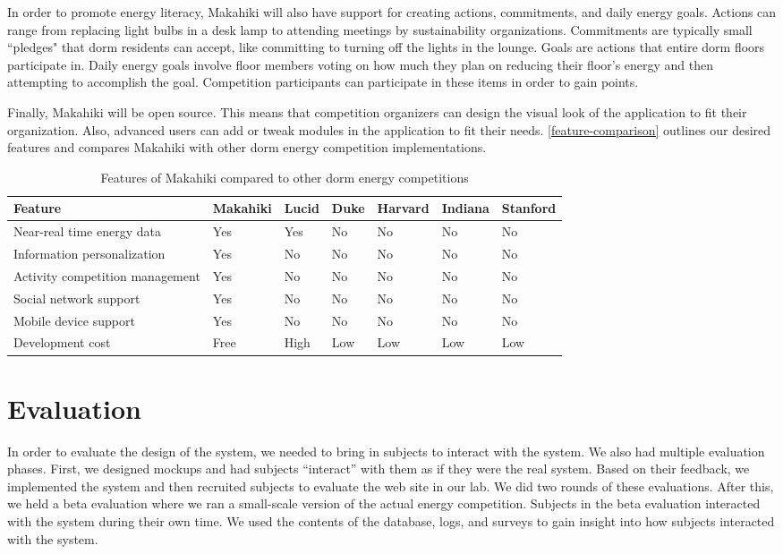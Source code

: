 In order to promote energy literacy, Makahiki will also have support for creating actions, commitments, and daily energy goals.  Actions can range from replacing light bulbs in a desk lamp to attending meetings by sustainability organizations.  Commitments are typically small ``pledges" that dorm residents can accept, like committing to turning off the lights in the lounge.  Goals are actions that entire dorm floors participate in.  Daily energy goals involve floor members voting on how much they plan on reducing their floor's energy and then attempting to accomplish the goal.  Competition participants can participate in these items in order to gain points.

Finally, Makahiki will be open source.  This means that competition organizers can design the visual look of the application to fit their organization.  Also, advanced users can add or tweak modules in the application to fit their needs.  \autoref{feature-comparison} outlines our desired features and compares Makahiki with other dorm energy competition implementations.

\begin{table}[h]
	\begin{tabular}{| l || l | l | l | l | l | l | }
		\hline
		Feature & Makahiki & Lucid & Duke & Harvard & Indiana & Stanford \\
		\hline
		Near-real time energy data & Yes & Yes & No & No & No & No \\
		Information personalization & Yes & No & No & No & No & No \\
		Activity competition management & Yes & No & No & No & No & No\\
		Social network support & Yes & No & No & No & No & No\\
		Mobile device support & Yes & No & No & No & No & No \\
		Development cost & Free & High & Low & Low & Low & Low \\
		\hline
	\end{tabular}
	\caption{Features of Makahiki compared to other dorm energy competitions}
	\label{feature-comparison}
\end{table}

\section{Evaluation}

In order to evaluate the design of the system, we needed to bring in subjects to interact with the system. We also had multiple evaluation phases. First, we designed mockups and had subjects ``interact'' with them as if they were the real system. Based on their feedback, we implemented the system and then recruited subjects to evaluate the web site in our lab. We did two rounds of these evaluations. After this, we held a beta evaluation where we ran a small-scale version of the actual energy competition. Subjects in the beta evaluation interacted with the system during their own time. We used the contents of the database, logs, and surveys to gain insight into how subjects interacted with the system.


